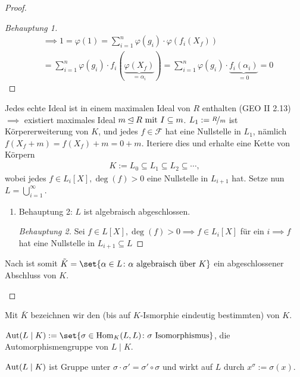 \begin{proof}
\begin{itemize}
\begin{enumerate}[label=]
\begin{proof}[Behauptung 1]
\begin{align*}
							&\implies 1 = \varphi(1) = \sum_{i=1}^n \varphi(g_i) \cdot \varphi(f_i (X_f))\\
							&= \sum_{i=1}^n \varphi(g_i) \cdot f_i (\underbrace{\varphi(X_f)}_{= \alpha_i}) = \sum_{i=1}^n \varphi(g_i) \cdot \underbrace{f_i (\alpha_i)}_{=0} = 0
						\end{align*}
					\end{proof}
				\end{enumerate}
		Jedes echte Ideal ist in einem maximalen Ideal von $R$ enthalten (GEO II 2.13) $\implies$ existiert maximales Ideal $m \unlhd R \mit I \subseteq m$. $L_1 := \lnkset{R}{m}$ ist Körpererweiterung von $K$, und jedes $f \in \mathscr{F}$ hat eine Nullstelle in $L_1$, nämlich $f(X_f + m) = f(X_f) + m = 0 + m$. Iteriere dies und erhalte eine Kette von Körpern
		\begin{align*}
			K := L_0 \subseteq L_1 \subseteq L_2 \subseteq \cdots,
		\end{align*}
		wobei jedes $f \in L_i [X], \deg(f) >0$ eine Nullstelle in $L_{i+1}$ hat. Setze nun $L = \bigcup_{i=1}^{\infty}$.
			\begin{enumerate}[label=]
				\item Behauptung 2: $L$ ist algebraisch abgeschlossen.
				\begin{proof}[Behauptung 2]
					Sei $f \in L[X], \deg(f) > 0 \implies f \in L_i [X]$ für ein $i \implies f$ hat eine Nullstelle in $L_{i+1} \subseteq L$
				\end{proof}
			\end{enumerate}
		Nach  ist somit $\tilde{K} = \set{\alpha \in L \colon \alpha \text{ algebraisch über }K}$ ein abgeschlossener Abschluss von $K$.
	\end{itemize}
\end{proof}
\begin{definition}
	Mit $\bar{K}$ bezeichnen wir den (bis auf $K$-Ismorphie eindeutig bestimmten)  von $K$.
\end{definition}
\begin{definition}[Automorphismengruppe]
	$\Aut(L\mid K) := \set{ \sigma \in \Hom_K (L,L)\colon \sigma \text{ Isomorphismus} }$, die Automorphismengruppe von $L\mid K$.
\end{definition}
\begin{remark}
	$\Aut(L \mid K)$ ist Gruppe unter $\sigma \cdot \sigma' = \sigma' \circ \sigma$ und wirkt auf $L$ durch $x^{\sigma} := \sigma(x)$.
\end{remark}
